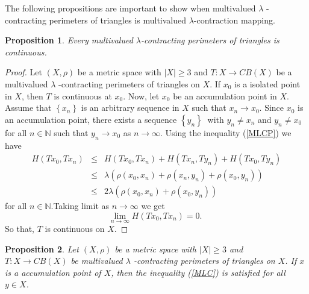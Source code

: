 \documentclass[reqno,11pt]{amsart}
\theoremstyle{plain}
\newtheorem{proposition}{Proposition}
\numberwithin{equation}{section}
\begin{document}
The following propositions are important to show when multivalued $\lambda $%
-contracting perimeters of triangles is multivalued $\lambda $-contraction
mapping.

\begin{proposition}
Every multivalued $\lambda $-contracting perimeters of triangles is
continuous.
\end{proposition}

\begin{proof}
Let $\left( X,\rho \right) $ be a metric space with $\left \vert
X\right
\vert \geq 3$ and $T:X\rightarrow CB(X)$ be a multivalued $\lambda $%
-contracting perimeters of triangles on $X$. If $x_{0}$ is a isolated point
in $X$, then $T$ is continuous at $x_{0}$. Now, let $x_{0}$ be an
accumulation point in $X$. Assume that $\left \{ x_{n}\right \} $ is an
arbitrary sequence in $X$ such that $x_{n}\rightarrow x_{0}$. Since $x_{0}$
is an accumulation point, there exists a sequence $\left \{ y_{n}\right \} ~$%
with $y_{n}\neq x_{n}$ and $y_{n}\neq x_{0}$ for all $n\in 
\mathbb{N}
$ such that $y_{n}\rightarrow x_{0}$ as $n\rightarrow \infty $. Using the
inequality (\ref{MLCP}) we have%
\begin{eqnarray*}
H\left( Tx_{0},Tx_{n}\right) &\leq &H\left( Tx_{0},Tx_{n}\right) +H\left(
Tx_{n},Ty_{n}\right) +H\left( Tx_{0},Ty_{n}\right) \\
&\leq &\lambda \left( \rho (x_{0},x_{n})+\rho (x_{n},y_{n})+\rho
(x_{0},y_{n})\right) \\
&\leq &2\lambda \left( \rho (x_{0},x_{n})+\rho (x_{0},y_{n})\right)
\end{eqnarray*}%
for all $n\in 
\mathbb{N}
.$Taking limit as $n\rightarrow \infty $ we get 
\begin{equation*}
\lim_{n\rightarrow \infty }H\left( Tx_{0},Tx_{n}\right) =0\text{. }
\end{equation*}%
So that, $T$ is continuous on $X$.
\end{proof}

\begin{proposition}
Let $\left( X,\rho \right) $ be a metric space with $\left \vert
X\right
\vert \geq 3$ and $T:X\rightarrow CB(X)$ be multivalued $\lambda $%
-contracting perimeters of triangles on $X$. If $x$ is a accumulation point
of $X$, then the inequality (\ref{MLC}) is satisfied for all $y\in X$.
\end{proposition}
\end{document}
